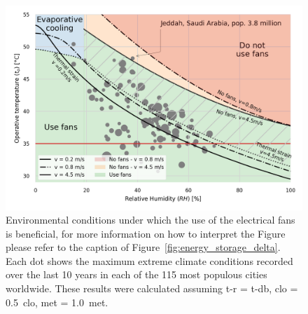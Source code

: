 \begin{figure}[thb!]
    \centering
    \includegraphics[width=\textwidth]{figures/use_fans_and_population}
    \caption{Environmental conditions under which the use of the electrical fans is beneficial, for more information on how to interpret the Figure please refer to the caption of Figure~\ref{fig:energy_storage_delta}.
    Each dot shows the maximum extreme climate conditions recorded over the last 10 years in each of the 115 most populous cities worldwide.
     These results were calculated assuming \ac{t-r} = \ac{t-db}, \ac{clo} = 0.5~clo, \ac{met} = 1.0~met.}
    \label{fig:use_fans_and_population}
\end{figure}
